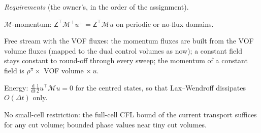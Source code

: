 \documentclass[11pt,a4paper]{article}
\newcommand{\dt}{\Delta t}
\newcommand{\MM}{\mathcal M}
\newcommand{\Z}{\mathsf Z}
\begin{document}
\emph{Requirements} (the owner's, in the order of the assignment).
\begin{description}[leftmargin=1.1cm,style=nextline,itemsep=2pt]
\item[R1] $\MM$-momentum: $\Z^\top\MM^+u^+=\Z^\top\MM u$ on periodic or no-flux domains.
\item[R2] Free stream with the VOF fluxes: the momentum fluxes are built from the VOF
  volume fluxes (mapped to the dual control volumes as now); a constant field stays
  constant to round-off through every sweep; the momentum of a constant field is
  $\rho^\pi\times$ VOF volume $\times\,u$.
\item[R3] Energy: $\frac{\mathrm d}{\mathrm dt}\tfrac12u^\top\MM u=0$ for the centred states,
  so that Lax--Wendroff dissipates $O(\dt)$ only.
\item[R4] No small-cell restriction: the full-cell CFL bound of the current transport
  suffices for any cut volume; bounded phase values near tiny cut volumes.
\end{description}

\end{document}
